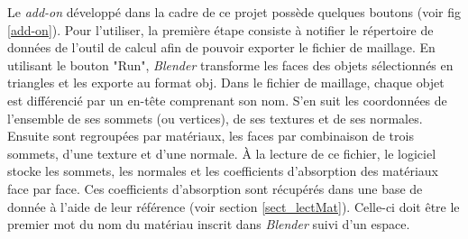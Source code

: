Le \textit{add-on} développé dans la cadre de ce projet possède quelques boutons (voir fig \ref{add-on}). Pour l'utiliser, la première étape consiste à notifier le répertoire de données de l'outil de calcul afin de pouvoir exporter le fichier de maillage. En utilisant le bouton "Run", \textit{Blender} transforme les faces des objets sélectionnés en triangles et les exporte au format \gls{obj}. Dans le fichier de maillage, chaque objet est différencié par un en-tête comprenant son nom. S'en suit les coordonnées de l'ensemble de ses sommets (ou vertices), de ses textures et de ses normales. Ensuite sont regroupées par matériaux, les faces par combinaison de trois sommets, d'une texture et d'une normale. À la lecture de ce fichier, le logiciel stocke les sommets, les normales et les coefficients d'absorption des matériaux face par face. Ces coefficients d'absorption sont récupérés dans une base de donnée à l'aide de leur référence (voir section \ref{sect_lectMat}). Celle-ci doit être le premier mot du nom du matériau inscrit dans \textit{Blender} suivi d'un espace.

